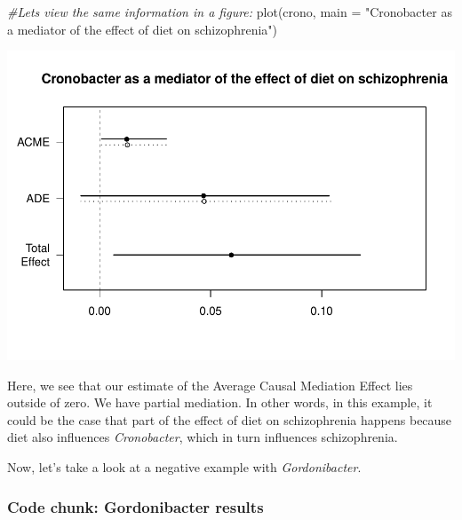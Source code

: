 \documentclass[
]{article}
\newenvironment{Shaded}{\begin{snugshade}}{\end{snugshade}}
\newcommand{\AttributeTok}[1]{\textcolor[rgb]{0.77,0.63,0.00}{#1}}
\newcommand{\CommentTok}[1]{\textcolor[rgb]{0.56,0.35,0.01}{\textit{#1}}}
\newcommand{\FunctionTok}[1]{\textcolor[rgb]{0.00,0.00,0.00}{#1}}
\newcommand{\NormalTok}[1]{#1}
\newcommand{\StringTok}[1]{\textcolor[rgb]{0.31,0.60,0.02}{#1}}
\begin{document}
\begin{Shaded}
\begin{Highlighting}[]
\CommentTok{\#Let\textquotesingle{}s view the same information in a figure:}
\FunctionTok{plot}\NormalTok{(crono, }\AttributeTok{main =} \StringTok{"Cronobacter as a mediator of the effect of diet on schizophrenia"}\NormalTok{)}
\end{Highlighting}
\end{Shaded}

\includegraphics{README_part2_files/figure-latex/plot_crono-1.pdf}

Here, we see that our estimate of the Average Causal Mediation Effect
lies outside of zero. We have partial mediation. In other words, in this
example, it could be the case that part of the effect of diet on
schizophrenia happens because diet also influences \emph{Cronobacter},
which in turn influences schizophrenia.

\newpage

Now, let's take a look at a negative example with \emph{Gordonibacter}.

\hypertarget{code-chunk-gordonibacter-results}{%
\subsubsection{Code chunk: Gordonibacter
results}\label{code-chunk-gordonibacter-results}}
\end{document}
